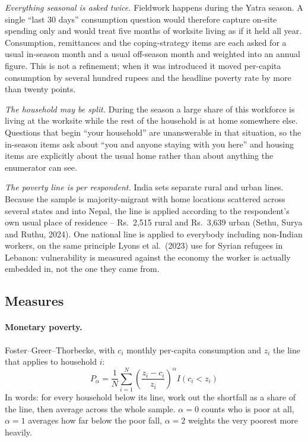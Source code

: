 \documentclass[11pt]{article}
\begin{document}
\emph{Everything seasonal is asked twice.} Fieldwork happens during the Yatra season. A single
``last 30 days'' consumption question would therefore capture on-site spending only and would
treat five months of worksite living as if it held all year. Consumption, remittances and the
coping-strategy items are each asked for a usual in-season month and a usual off-season month
and weighted into an annual figure. This is not a refinement; when it was introduced it moved
per-capita consumption by several hundred rupees and the headline poverty rate by more than
twenty points.

\emph{The household may be split.} During the season a large share of this workforce is living
at the worksite while the rest of the household is at home somewhere else. Questions that begin
``your household'' are unanswerable in that situation, so the in-season items ask about ``you
and anyone staying with you here'' and housing items are explicitly about the usual home rather
than about anything the enumerator can see.

\emph{The poverty line is per respondent.} India sets separate rural and urban lines. Because
the sample is majority-migrant with home locations scattered across several states and into
Nepal, the line is applied according to the respondent's own usual place of residence --
Rs.\ 2,515 rural and Rs.\ 3,639 urban (Sethu, Surya and Ruthu, 2024). One national line is
applied to everybody including non-Indian workers, on the same principle Lyons et al.\ (2023)
use for Syrian refugees in Lebanon: vulnerability is measured against the economy the worker is
actually embedded in, not the one they came from.

\subsection{Measures}

\paragraph{Monetary poverty.} Foster--Greer--Thorbecke, with $c_i$ monthly per-capita
consumption and $z_i$ the line that applies to household $i$:
\begin{equation}
P_\alpha = \frac{1}{N} \sum_{i=1}^{N} \left( \frac{z_i - c_i}{z_i} \right)^\alpha I(c_i < z_i)
\end{equation}
In words: for every household below its line, work out the shortfall as a share of the line,
then average across the whole sample. $\alpha = 0$ counts who is poor at all, $\alpha = 1$
averages how far below the poor fall, $\alpha = 2$ weights the very poorest more heavily.
\end{document}
